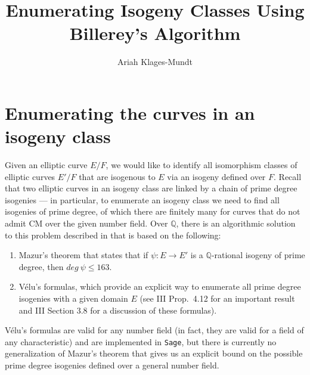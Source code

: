 \documentclass{amsart}
\theoremstyle{definition}
\newcommand{\Q}{\mathbb{Q}}
\begin{document}
\title{Enumerating Isogeny Classes Using Billerey's Algorithm}

\author{Ariah Klages-Mundt}

\address{Department of Mathematics\\ 
Amherst College\\Amherst, MA 01002}


\renewcommand{\setminus}{\smallsetminus}




\maketitle




\section{Enumerating the curves in an isogeny class} \label{section 4}

Given an elliptic curve $E/F$, we would like to identify all isomorphism classes of elliptic curves $E'/F$ that are isogenous to $E$ via an isogeny defined over $F$. Recall that two elliptic curves in an isogeny class are linked by a chain of prime degree isogenies --- in particular, to enumerate an isogeny class we need to find all isogenies of prime degree, of which there are finitely many for curves that do not admit CM over the given number field. Over $\Q$, there is an algorithmic solution to this problem described in \cite{cremona97} that is based on the following:

\begin{enumerate}
\item Mazur's theorem that states that if $\psi: E \rightarrow E'$ is a $\Q$-rational isogeny of prime degree, then $deg \ \psi \leq 163$.
\item V{\'e}lu's formulas, which provide an explicit way to enumerate all prime degree isogenies with a given domain $E$ (see \cite{silverman92} III Prop.~4.12 for an important result and \cite{cremona97} III Section 3.8 for a discussion of these formulas).
\end{enumerate}

V{\'e}lu's formulas are valid for any number field (in fact, they are valid for a field of any characteristic) and are implemented in {\tt Sage}, but there is currently no generalization of Mazur's theorem that gives us an explicit bound on the possible prime degree isogenies defined over a general number field.
\end{document}
